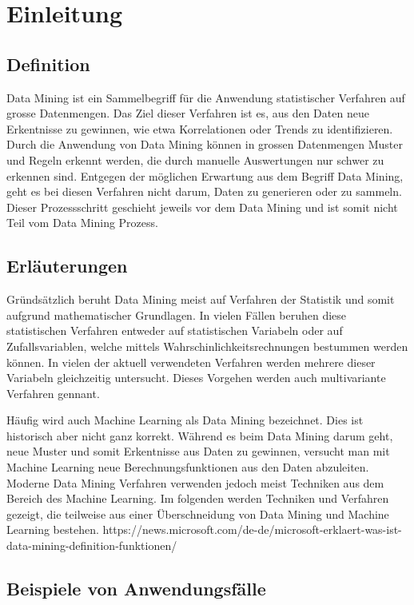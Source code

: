 \chapter{Einleitung}

\section{Definition}
Data Mining ist ein Sammelbegriff für die Anwendung statistischer Verfahren auf grosse Datenmengen. Das Ziel dieser Verfahren ist es, aus den Daten neue Erkentnisse zu gewinnen, wie etwa Korrelationen oder Trends zu identifizieren. Durch die Anwendung von Data Mining können in grossen Datenmengen Muster und Regeln erkennt werden, die durch manuelle Auswertungen nur schwer zu erkennen sind.
Entgegen der möglichen Erwartung aus dem Begriff Data Mining, geht es bei diesen Verfahren nicht darum, Daten zu generieren oder zu sammeln. Dieser Prozessschritt geschieht jeweils vor dem Data Mining und ist somit nicht Teil vom Data Mining Prozess. 

\section{Erläuterungen}
Gründsätzlich beruht Data Mining meist auf Verfahren der Statistik und somit aufgrund mathematischer Grundlagen. In vielen Fällen beruhen diese statistischen Verfahren entweder auf statistischen Variabeln oder auf Zufallsvariablen, welche mittels Wahrschinlichkeitsrechnungen bestummen werden können. In vielen der aktuell verwendeten Verfahren werden mehrere dieser Variabeln gleichzeitig untersucht. Dieses Vorgehen werden auch multivariante Verfahren gennant.

Häufig wird auch Machine Learning als Data Mining bezeichnet. Dies ist historisch aber nicht ganz korrekt. Während es beim Data Mining darum geht, neue Muster und somit Erkentnisse aus Daten zu gewinnen, versucht man mit Machine Learning neue Berechnungsfunktionen aus den Daten abzuleiten. Moderne Data Mining Verfahren verwenden jedoch meist Techniken aus dem Bereich des Machine Learning. Im folgenden werden Techniken und Verfahren gezeigt, die teilweise aus einer Überschneidung von Data Mining und Machine Learning bestehen.
https://news.microsoft.com/de-de/microsoft-erklaert-was-ist-data-mining-definition-funktionen/

\clearpage
\section{Beispiele von Anwendungsfälle}
